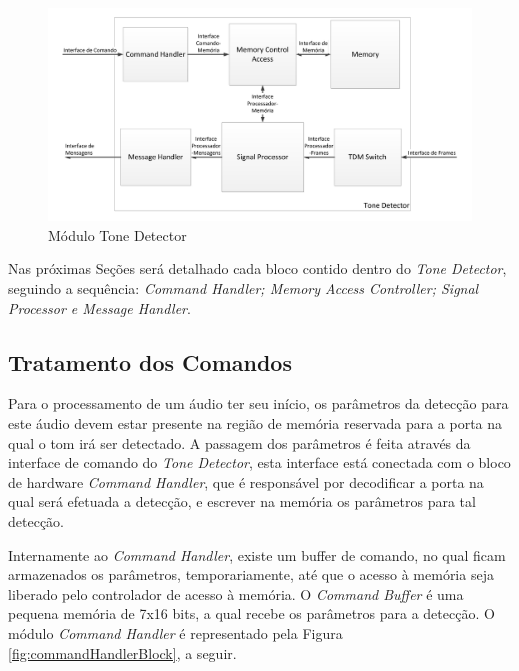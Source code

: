 \documentclass[monografia]{subfiles}
\begin{document}
			\begin{figure}[!h]
			\centering 
			\includegraphics[scale=0.36]{img/modulos/modules_detail.pdf}
			\caption{Módulo Tone Detector}
			\label{fig:toneDetectorBlock}
			\end{figure}	

		Nas próximas Seções será detalhado cada bloco contido dentro do \textit{Tone Detector}, seguindo a sequência: 
		\textit{Command Handler; Memory Access Controller; Signal Processor e Message Handler}.



	\subsection{Tratamento dos Comandos}
		Para o processamento de um áudio ter seu início, os parâmetros da detecção para este áudio devem estar presente na região 
		de memória reservada para a porta na qual o tom irá ser detectado. A passagem dos parâmetros é feita através da interface de comando
		do \textit{Tone Detector}, esta interface está conectada com o bloco de hardware \textit{Command Handler}, que é responsável por decodificar
		a porta na qual será efetuada a detecção, e escrever na memória os parâmetros para tal detecção. 
		
		Internamente ao \textit{Command Handler}, existe um buffer de comando, no qual ficam armazenados os parâmetros, temporariamente, 
		até que o acesso à memória seja liberado pelo controlador de acesso à memória. O \textit{Command Buffer} é uma pequena 
		memória de 7x16 bits, a qual recebe os parâmetros para a detecção.  
		O módulo \textit{Command Handler} é representado pela Figura \ref{fig:commandHandlerBlock}, a seguir.
\end{document}
